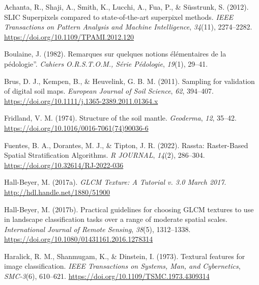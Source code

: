 \documentclass[
  letterpaper,
  DIV=11,
  numbers=noendperiod]{scrartcl}
\newlength{\cslhangindent}
\newlength{\cslentryspacingunit} %
\newenvironment{CSLReferences}[2] %
 {%
  \setlength{\parindent}{0pt}
  \ifodd #1
  \let\oldpar\par
  \def\par{\hangindent=\cslhangindent\oldpar}
  \fi
  \setlength{\parskip}{#2\cslentryspacingunit}
 }%
 {}
\begin{document}
\hypertarget{refs}{}
\begin{CSLReferences}{1}{0}
\leavevmode{}%
Achanta, R., Shaji, A., Smith, K., Lucchi, A., Fua, P., \& Süsstrunk, S.
(2012). {SLIC Superpixels} compared to state-of-the-art superpixel
methods. \emph{IEEE Transactions on Pattern Analysis and Machine
Intelligence}, \emph{34}(11), 2274--2282.
\url{https://doi.org/10.1109/TPAMI.2012.120}

\leavevmode{}%
Boulaine, J. (1982). Remarques sur quelques notions élémentaires de la
pédologie''. \emph{{Cahiers O.R.S.T.O.M., Série Pédologie}},
\emph{19}(1), 29--41.

\leavevmode{}%
Brus, D. J., Kempen, B., \& Heuvelink, G. B. M. (2011). Sampling for
validation of digital soil maps. \emph{European Journal of Soil
Science}, \emph{62}, 394--407.
\url{https://doi.org/10.1111/j.1365-2389.2011.01364.x}

\leavevmode{}%
Fridland, V. M. (1974). Structure of the soil mantle. \emph{Geoderma},
\emph{12}, 35--42. \url{https://doi.org/10.1016/0016-7061(74)90036-6}

\leavevmode{}%
Fuentes, B. A., Dorantes, M. J., \& Tipton, J. R. (2022). Rassta:
{Raster-Based Spatial Stratification Algorithms}. \emph{R JOURNAL},
\emph{14}(2), 286--304. \url{https://doi.org/10.32614/RJ-2022-036}

\leavevmode{}%
Hall-Beyer, M. (2017a). \emph{{GLCM Texture}: {A Tutorial} v. 3.0
{March} 2017}. \url{http://hdl.handle.net/1880/51900}

\leavevmode{}%
Hall-Beyer, M. (2017b). Practical guidelines for choosing {GLCM}
textures to use in landscape classification tasks over a range of
moderate spatial scales. \emph{International Journal of Remote Sensing},
\emph{38}(5), 1312--1338.
\url{https://doi.org/10.1080/01431161.2016.1278314}

\leavevmode{}%
Haralick, R. M., Shanmugam, K., \& Dinstein, I. (1973). Textural
features for image classification. \emph{IEEE Transactions on Systems,
Man, and Cybernetics}, \emph{SMC-3}(6), 610--621.
\url{https://doi.org/10.1109/TSMC.1973.4309314}


\end{CSLReferences}
\end{document}
